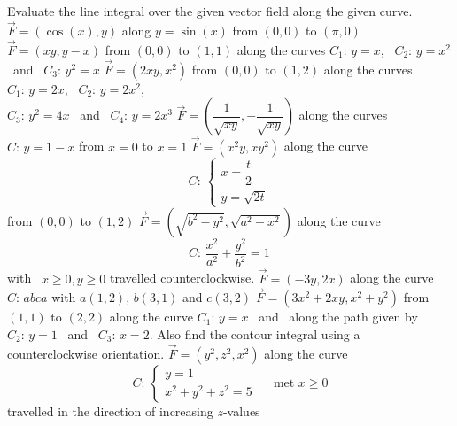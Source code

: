 \subsection*{}
\begin{Exercise} Evaluate the line integral over the given vector field along the given curve. 
	\Question[difficulty = 1] $\vec F = \left(\cos (x), y \right)$ \quad along $y=\sin(x)$ from $(0,0)$ to $(\pi,0)$
	\Question[difficulty = 1] $\vec F = (xy, y-x)$ \quad from $(0,0)$ to $(1,1)$ along the curves $C_1: \, y=x$, \, $C_2: \, y=x^2$ \, and \, $C_3: \, y^2=x$
	\Question[difficulty = 2] $\vec F = (2xy, x^2)$ \quad from $(0,0)$ to $(1,2)$ along the curves $C_1: \, y=2x$, \, $C_2: \, y=2x^2$, \\ $C_3: \, y^2=4x$ \, and \, $C_4: \, y=2x^3$
	\Question[difficulty = 2] $\vec F = \left(\dfrac{1}{\sqrt{xy}}, -\dfrac{1}{\sqrt{xy}} \right)$ \quad along the curves $C: \, y=1-x$ from $x=0$ to $x=1$ 
	\Question[difficulty = 1] $\vec F = (x^2y, xy^2)$ \quad along the curve $$C: \, \left\{ \begin{array}{l} x = \dfrac{t}{2} \\[0.2cm] y = \sqrt{2t} \end{array} \right.$$ from $(0,0)$ to $(1,2)$ 
	\Question[difficulty = 2] $\vec F = \left(\sqrt{b^2-y^2}, \sqrt{a^2-x^2} \right)$ \quad along the curve $$C: \, \dfrac{x^2}{a^2} + \dfrac{y^2}{b^2} = 1\, $$ with \, $x\geq 0, y \geq 0$ travelled counterclockwise. 
	\Question[difficulty = 2] $\vec F = (-3y, 2x)$ \quad along the curve $C: \, abca$ with $a(1,2)$, $b(3,1)$ and $c(3,2)$
	\Question[difficulty = 3] $\vec F = \left(3x^2+2xy, x^2+y^2 \right)$ \quad from $(1,1)$ to $(2,2)$ along the curve $C_1: \, y=x$  \, and \, along the path given by $C_2: \, y=1$ \, and \, $C_3: \, x=2$. 
	Also find the contour integral using a counterclockwise orientation.
	\Question[difficulty = 3] $\vec F = (y^2, z^2, x^2)$ \quad along the curve $$C: \, \left\{ \begin{array}{l} y=1  \\ x^2 + y^2 + z^2 = 5 \end{array} \right.\quad \text{ met } x \geq 0$$ travelled in the direction of increasing $z$-values
\end{Exercise}

